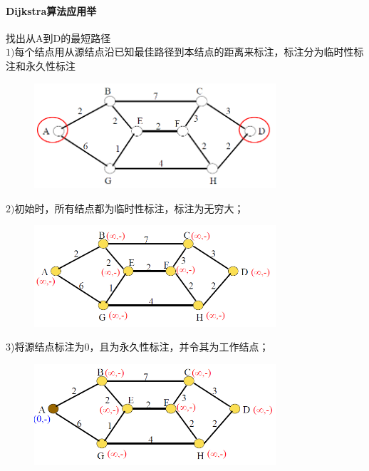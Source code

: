 \documentclass[11pt,a4paper,openany]{book}
\begin{document}
\paragraph{Dijkstra算法应用举}找出从A到D的最短路径\\
$1)$每个结点用从源结点沿已知最佳路径到本结点的距离来标注，标注分为临时性标注和永久性标注
\begin{figure}[H]
  \centering
  \includegraphics[width=0.8\textwidth]{dj1.png}\\
  \caption*{}
\end{figure}
$2)$初始时，所有结点都为临时性标注，标注为无穷大；
\begin{figure}[H]
  \centering
  \includegraphics[width=0.8\textwidth]{dj2.png}\\
  \caption*{}
\end{figure}
3)将源结点标注为$0$，且为永久性标注，并令其为工作结点；
\begin{figure}[H]
  \centering
  \includegraphics[width=0.8\textwidth]{dj3.png}\\
  \caption*{}
\end{figure}
\end{document}

